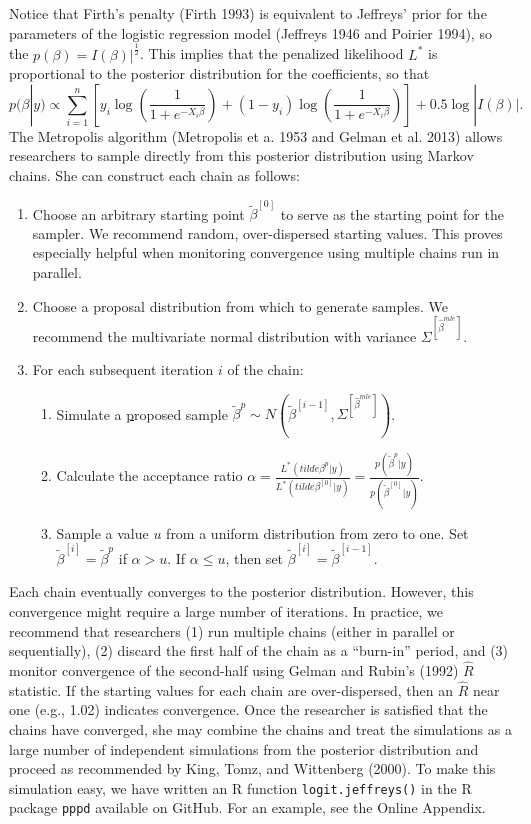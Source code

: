 \documentclass[12pt]{article}
\begin{document}
Notice that Firth's penalty (Firth 1993) is equivalent to Jeffreys' prior for the parameters of the logistic regression model (Jeffreys 1946 and Poirier 1994), so the $p(\beta) = I(\beta)|^\frac{1}{2}$. This implies that the penalized likelihood $L^*$ is proportional to the posterior distribution for the coefficients, so that 
\begin{equation}\label{eqn:post}
p(\beta | y) \propto \sum_{i = 1}^n \left[y_i \log \left( \dfrac{1}{1 + e^{-X_i\beta}}\right) + (1 - y_i) \log \left( \dfrac{1}{1 + e^{-X_i\beta}}\right)\right] + 0.5 \log |I(\beta)|.
\end{equation}
The Metropolis algorithm (Metropolis et a. 1953 and Gelman et al. 2013) allows researchers to sample directly from this posterior distribution using Markov chains. She can construct each chain as follows:
\begin{enumerate}
\item Choose an arbitrary starting point $\tilde{\beta}^{[0]}$ to serve as the starting point for the sampler.  We recommend random, over-dispersed starting values. This proves especially helpful when monitoring convergence using multiple chains run in parallel. 
\item Choose a proposal distribution from which to generate samples. We recommend the multivariate normal distribution with variance $\Sigma^{[\hat{\beta}^{mle}]}$.
\item For each subsequent iteration $i$ of the chain:
	\begin{enumerate}
	\item Simulate a \underline{p}roposed sample $\tilde{\beta}^{p} \sim N(\tilde{\beta}^{[i - 1]}, \Sigma^{[\hat{\beta}^{mle}]})$.
	\item Calculate the acceptance ratio $\alpha = \frac{L^*(tilde{\beta}^{p} | y)}{L^*(tilde{\beta}^{[0]} | y)} = \frac{p(\tilde{\beta}^{p} | y)}{p(\tilde{\beta}^{[0]} | y)}$.
	\item Sample a value $u$ from a uniform distribution from zero to one. Set $\tilde{\beta}^{[i]} = \tilde{\beta}^{p}$ if $\alpha > u$. If $\alpha \leq u$, then set $\tilde{\beta}^{[i]} = \tilde{\beta}^{[i - 1]}$.
	\end{enumerate}
\end{enumerate} 

Each chain eventually converges to the posterior distribution. However, this convergence might require a large number of iterations. In practice, we recommend that researchers (1) run multiple chains (either in parallel or sequentially), (2) discard the first half of the chain as a ``burn-in'' period, and (3) monitor convergence of the second-half using Gelman and Rubin's (1992) $\hat{R}$ statistic. If the starting values for each chain are over-dispersed, then an $\hat{R}$ near one (e.g., 1.02) indicates convergence. Once the researcher is satisfied that the chains have converged, she may combine the chains and treat the simulations as a large number of independent simulations from the posterior distribution and proceed as recommended by King, Tomz, and Wittenberg (2000). To make this simulation easy, we have written an R function \texttt{logit.jeffreys()} in the R package \texttt{pppd} available on GitHub. For an example, see the Online Appendix.
\end{document}
